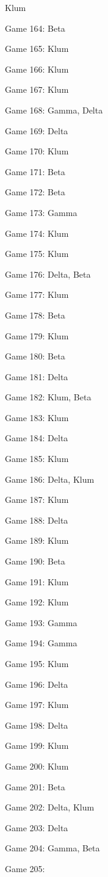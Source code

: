 \documentclass{article}
\begin{document}
\begin{multicols}{3}
\begin{compactitem}
Klum
\item Game 164:
Beta
\item Game 165:
Klum
\item Game 166:
Klum
\item Game 167:
Klum
\item Game 168:
Gamma, Delta
\item Game 169:
Delta
\item Game 170:
Klum
\item Game 171:
Beta
\item Game 172:
Beta
\item Game 173:
Gamma
\item Game 174:
Klum
\item Game 175:
Klum
\item Game 176:
Delta, Beta
\item Game 177:
Klum
\item Game 178:
Beta
\item Game 179:
Klum
\item Game 180:
Beta
\item Game 181:
Delta
\item Game 182:
Klum, Beta
\item Game 183:
Klum
\item Game 184:
Delta
\item Game 185:
Klum
\item Game 186:
Delta, Klum
\item Game 187:
Klum
\item Game 188:
Delta
\item Game 189:
Klum
\item Game 190:
Beta
\item Game 191:
Klum
\item Game 192:
Klum
\item Game 193:
Gamma
\item Game 194:
Gamma
\item Game 195:
Klum
\item Game 196:
Delta
\item Game 197:
Klum
\item Game 198:
Delta
\item Game 199:
Klum
\item Game 200:
Klum
\item Game 201:
Beta
\item Game 202:
Delta, Klum
\item Game 203:
Delta
\item Game 204:
Gamma, Beta
\item Game 205:

\end{compactitem}
\end{multicols}
\end{document}
